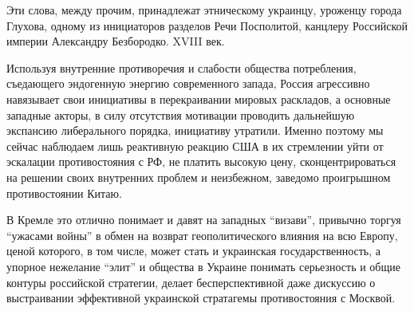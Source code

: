 Эти слова, между прочим, принадлежат этническому украинцу, уроженцу города
Глухова, одному из инициаторов разделов Речи Посполитой, канцлеру Российской
империи Александру Безбородко. XVIII век.

Используя внутренние противоречия и слабости общества потребления, съедающего
эндогенную энергию современного запада, Россия агрессивно навязывает свои
инициативы в перекраивании мировых раскладов, а основные западные акторы, в
силу отсутствия мотивации проводить дальнейшую экспансию либерального порядка,
инициативу утратили. Именно поэтому мы сейчас наблюдаем лишь реактивную реакцию
США в их стремлении уйти от эскалации противостояния с РФ, не платить высокую
цену, сконцентрироваться на решении своих внутренних проблем и неизбежном,
заведомо проигрышном противостоянии Китаю.

В Кремле это отлично понимает и давят на западных \enquote{визави}, привычно торгуя
\enquote{ужасами войны} в обмен на возврат геополитического влияния на всю Европу,
ценой которого, в том числе, может стать и украинская государственность, а
упорное нежелание \enquote{элит} и общества в Украине понимать серьезность и общие
контуры российской стратегии, делает бесперспективной даже дискуссию о
выстраивании эффективной украинской стратагемы противостояния с Москвой.


